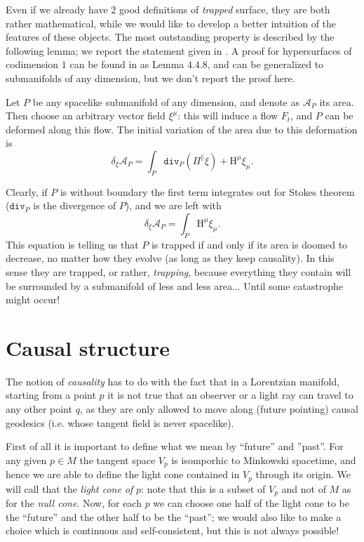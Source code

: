 Even if we already have \(2\) good definitions of \emph{trapped} surface, they are both rather mathematical, while we would like to develop a better intuition of the features of these objects. The most outstanding property is described by the following lemma; we report the statement given in \cite{senovilla2022critical}. A proof for hypersurfaces of codimension \(1\) can be found in \cite{kriele1999spacetime} as Lemma \(4.4.8\), and can be generalized to submanifolds of any dimension, but we don't report the proof here.
\begin{lemma}
	\label{lemma:variation-area}
	Let \(P\) be any spacelike submanifold of any dimension, and denote as \(\mathcal{A}_P\) its area. Then choose an arbitrary vector field \(\xi^{\mu}\): this will induce a flow \(F_t\), and \(P\) can be deformed along this flow. The initial variation of the area due to this deformation is
	\[
	\delta_{\xi}\mathcal{A}_P = \int_{P} \texttt{div}_P (\Pi^{\parallel}\xi) + \mathrm{H}^{\mu}\xi_{\mu}.
	\]
\end{lemma}
 Clearly, if \(P\) is without boundary the first term integrates out for Stokes theorem (\(\texttt{div}_P\) is the divergence of \(P\)), and we are left with
 \begin{equation}
 	\label{eq:variation-area}
 	\delta_{\xi}\mathcal{A}_P = \int_{P} \mathrm{H}^{\mu}\xi_{\mu}.
 \end{equation}
	This equation is telling us that \(P\) is trapped if and only if its area is doomed to decrease, no matter how they evolve (as long as they keep causality). In this sense they are trapped, or rather, \emph{trapping}, because everything they contain will be surrounded by a submanifold of less and less area... Until some catastrophe might occur!

\section{Causal structure}

The notion of \emph{causality} has to do with the fact that in a Lorentzian manifold, starting from a  point \(p\) it is not true that an observer or a light ray can travel to any other point \(q\), as they are only allowed to move along (future pointing) causal geodesics (i.e. whose tangent field is never spacelike).

First of all it is important to define what we mean by ``future'' and ''past''. For any given \(p\in M\) the tangent space \(V_p\) is isomporhic to Minkowski spacetime, and hence we are able to define the light cone contained in \(V_p\) through its origin. We will call that the \emph{light cone of} \(p\): note that this is a subset of \(V_p\) and not of \(M\) as for the \emph{null cone}.
Now, for each \(p\) we can choose one half of the light cone to be the ``future'' and the other half to be the ``past''; we would also like to make a choice which is continuous and self-consistent, but this is not always possible!

